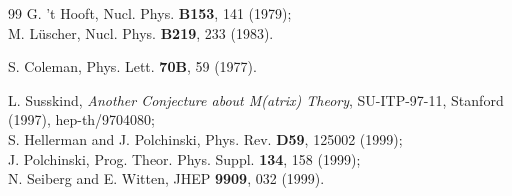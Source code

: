 \documentclass[a4paper,12pt]{article}
\begin{document}
\begin{thebibliography} {99}
G. 't Hooft, Nucl. Phys. {\bf B153}, 141 (1979); \\
M. L\"uscher, Nucl. Phys. {\bf B219}, 233 (1983).

S. Coleman, Phys. Lett. {\bf 70B}, 59 (1977).

L. Susskind, {\it Another Conjecture about M(atrix) Theory}, 
SU-ITP-97-11, Stanford (1997), hep-th/9704080; \\
S. Hellerman and J. Polchinski, 
Phys. Rev. {\bf D59}, 125002 (1999); \\
J. Polchinski, 
Prog. Theor. Phys. Suppl. {\bf 134}, 158 (1999); \\
N. Seiberg and E. Witten,
JHEP {\bf 9909}, 032 (1999). 


\end{thebibliography}
\end{document}
